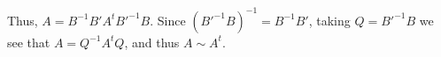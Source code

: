 \documentclass[11pt]{scrartcl}
\begin{document}
\begin{soln}





  Thus, $A = B^{-1}B'A^tB'^{-1}B$. Since $(B'^{-1}B)^{-1} = B^{-1}B'$,
  taking $Q = B'^{-1}B$ we see that $A = Q^{-1}A^tQ$, and thus $A\sim A^t$.
\end{soln}
\end{document}
